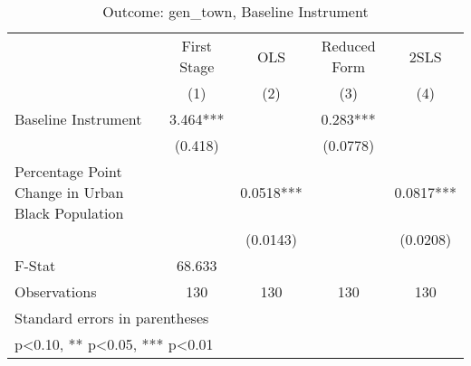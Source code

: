 \begin{table}[htbp]\centering
\def\sym#1{\ifmmode^{#1}\else\(^{#1}\)\fi}
\caption{Outcome: gen\_town, Baseline Instrument}
\begin{tabular}{l*{4}{c}}
\toprule
                    & First Stage   &         OLS   &Reduced Form   &        2SLS   \\
                    &\multicolumn{1}{c}{(1)}   &\multicolumn{1}{c}{(2)}   &\multicolumn{1}{c}{(3)}   &\multicolumn{1}{c}{(4)}   \\
\midrule
Baseline Instrument &       3.464***&               &       0.283***&               \\
                    &     (0.418)   &               &    (0.0778)   &               \\
\addlinespace
Percentage Point Change in Urban Black Population&               &      0.0518***&               &      0.0817***\\
                    &               &    (0.0143)   &               &    (0.0208)   \\
\midrule
F-Stat              &      68.633   &               &               &               \\
Observations        &         130   &         130   &         130   &         130   \\
\bottomrule
\multicolumn{5}{l}{\footnotesize Standard errors in parentheses}\\
\multicolumn{5}{l}{\footnotesize * p<0.10, ** p<0.05, *** p<0.01}\\
\end{tabular}
\end{table}
